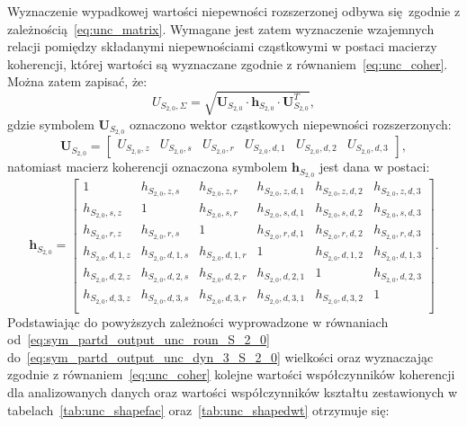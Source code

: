Wyznaczenie wypadkowej wartości niepewności rozszerzonej odbywa się zgodnie z zależnością~\eqref{eq:unc_matrix}. Wymagane jest zatem wyznaczenie wzajemnych relacji pomiędzy składanymi niepewnościami cząstkowymi w postaci macierzy koherencji, której wartości są wyznaczane zgodnie z równaniem~\eqref{eq:unc_coher}. Można zatem zapisać, że:
\begin{equation}
U_{S_{2,0},\Sigma} = \sqrt{\mathbf{U}_{S_{2,0}} \cdot \mathbf{h}_{S_{2,0}} \cdot \mathbf{U}_{S_{2,0}}^{T}} \label{eq:sym_partd_output_unc_summul_S_2_0},
\end{equation}
gdzie symbolem $\mathbf{U}_{S_{2,0}}$ oznaczono wektor cząstkowych niepewności rozszerzonych:
\begin{equation}
\mathbf{U}_{S_{2,0}} =
\begin{bmatrix}
U_{S_{2,0},z} & U_{S_{2,0},s} & U_{S_{2,0},r} & U_{S_{2,0},d,1} & U_{S_{2,0},d,2} & U_{S_{2,0},d,3}
\end{bmatrix}
\label{eq:sym_partd_output_unc_sumuvect_S_2_0_a},
\end{equation}
natomiast macierz koherencji oznaczona symbolem $\mathbf{h}_{S_{2,0}}$ jest dana w postaci:
\begin{equation}
\mathbf{h}_{S_{2,0}} =
\begin{bmatrix}
1                 & h_{S_{2,0},z,s}   & h_{S_{2,0},z,r}   & h_{S_{2,0},z,d,1} & h_{S_{2,0},z,d,2} & h_{S_{2,0},z,d,3} \\
h_{S_{2,0},s,z}   & 1                 & h_{S_{2,0},s,r}   & h_{S_{2,0},s,d,1} & h_{S_{2,0},s,d,2} & h_{S_{2,0},s,d,3} \\
h_{S_{2,0},r,z}   & h_{S_{2,0},r,s}   & 1                 & h_{S_{2,0},r,d,1} & h_{S_{2,0},r,d,2} & h_{S_{2,0},r,d,3} \\
h_{S_{2,0},d,1,z} & h_{S_{2,0},d,1,s} & h_{S_{2,0},d,1,r} & 1                 & h_{S_{2,0},d,1,2} & h_{S_{2,0},d,1,3} \\
h_{S_{2,0},d,2,z} & h_{S_{2,0},d,2,s} & h_{S_{2,0},d,2,r} & h_{S_{2,0},d,2,1} & 1                 & h_{S_{2,0},d,2,3} \\
h_{S_{2,0},d,3,z} & h_{S_{2,0},d,3,s} & h_{S_{2,0},d,3,r} & h_{S_{2,0},d,3,1} & h_{S_{2,0},d,3,2} & 1                 \\
\end{bmatrix}
\label{eq:sym_partd_output_unc_sumcoher_S_2_0}.
\end{equation}
Podstawiając do powyższych zależności wyprowadzone w równaniach od~\eqref{eq:sym_partd_output_unc_roun_S_2_0} do~\eqref{eq:sym_partd_output_unc_dyn_3_S_2_0} wielkości oraz wyznaczając zgodnie z równaniem~\eqref{eq:unc_coher} kolejne wartości współczynników koherencji dla analizowanych danych oraz wartości współczynników kształtu zestawionych w tabelach~\ref{tab:unc_shapefac} oraz~\ref{tab:unc_shapedwt} otrzymuje się:
